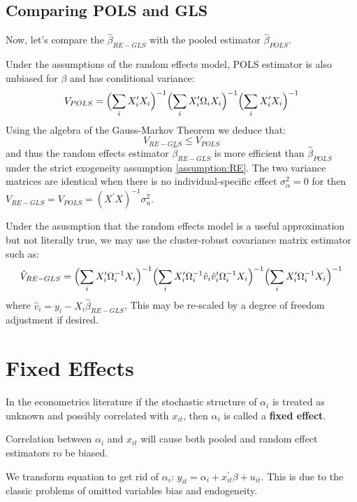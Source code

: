 \subsection{Comparing POLS and GLS}

Now, let's compare the $\hat{\beta}_{RE-GLS}$ with the pooled estimator $\hat{\beta}_{POLS}$.

Under the assumptions of the random effects model, POLS estimator is also unbiased for $\beta$ and has conditional variance:
\begin{gather*}
    V_{POLS} = \Bigl(\sum_{i} X_i^{\prime} X_i \Bigr)^{-1} \Bigl( \sum_{i}  X_i^{\prime} \Omega_i X_i \Bigr)^{-1} \Bigl( \sum_{i}  X_i^{\prime} X_i \Bigr)^{-1} 
\end{gather*}
Using the algebra of the Gauss-Markov Theorem we deduce that:
\[V_{RE-GLS} \leq V_{POLS} \]
and thus the random effects estimator $\hat{\beta}_{RE-GLS}$ is more efficient than $\hat{\beta}_{POLS} $ under the strict exogeneity assumption \ref{assumption:RE}.
The two variance matrices are identical when there is no individual-specific effect $\sigma_{\alpha}^2 = 0$ for then $V_{RE-GLS} = V_{POLS} = \left(X^{\prime} X\right)^{-1} \sigma_u^2.$

Under the asusmption that the random effects model is a useful approximation but not literally true, 
we may use the cluster-robust covariance matrix estimator such as:
\begin{gather*}
    \hat{V}_{RE-GLS} = \Bigl(\sum_{i} X_i^{\prime} \Omega_i^{-1} X_i\Bigr)^{-1} \Bigl( \sum_{i} X_i^{\prime} \Omega_i^{-1} \hat{v}_i \hat{v}_i^{\prime} \Omega_i^{-1} X_i \Bigr)^{-1} \Bigl( \sum_{i} X_i^{\prime} \Omega_i^{-1} X_i \Bigr)^{-1} 
\end{gather*}
where $\hat{v}_i = y_i - X_i \hat{\beta}_{RE-GLS}$, This may be re-scaled by a degree of freedom adjustment if desired.

\section{Fixed Effects}
In the econometrics literature if the stochastic structure of $\alpha_i$ is treated as unknown
and possibly correlated with $x_{it}$, then $\alpha_i$ is called a \textbf{fixed effect}.

Correlation between $\alpha_i$ and $x_{it}$ will cause both pooled and random effect estimators ro be biased.

We transform equation to get rid of $\alpha_i$: $y_{it} = \alpha_i + x_{it}^{\prime} \beta + u_{it}.$
This is due to the classic problems of omitted variables bias and endogeneity. 

